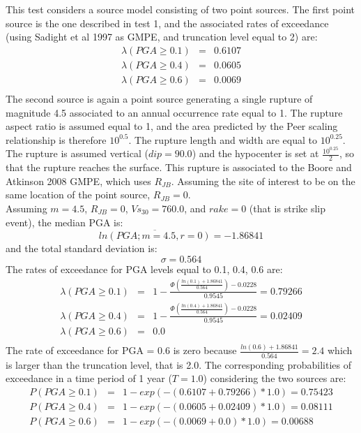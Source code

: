 This test considers a source model consisting of two point sources. The
first point source is the one described in test 1, and the associated rates of
exceedance (using Sadight et al 1997 as GMPE, and truncation level equal to 2)
are:
 \begin{eqnarray}
\lambda(PGA \geq 0.1) & = & 0.6107 \nonumber \\
\lambda(PGA \geq 0.4) & = & 0.0605 \nonumber \\
\lambda(PGA \geq 0.6) & = & 0.0069 \nonumber \\
\end{eqnarray}
The second source is again a point source generating a single rupture of
magnitude 4.5 associated to an annual occurrence rate equal to 1. The rupture
aspect ratio is assumed equal to 1, and the area predicted by the Peer scaling
relationship is therefore $10^{0.5}$. The rupture length and width are equal to
$10^{0.25}$. The rupture is assumed vertical ($dip = 90.0$) and the hypocenter
is set at $\frac{10^{0.25}}{2}$, so that the rupture reaches the surface.  This
rupture is associated to the Boore and Atkinson 2008 GMPE, which uses $R_{JB}$.
Assuming the site of interest to be on the same location of the point source,
$R_{JB} = 0$.\\
Assuming $m = 4.5$, $R_{JB} = 0$, $Vs_{30} = 760.0$, and $rake = 0$ (that is strike slip event), the median PGA is:
\begin{equation}
\overline{ln(PGA;m=4.5,r=0)} = - 1.86841
\end{equation}
and the total standard deviation is:
\begin{equation}
\sigma = 0.564
\end{equation}
The rates of exceedance for PGA levels equal to 0.1, 0.4, 0.6 are:
\begin{eqnarray}
\lambda(PGA \geq 0.1) & = & 1 - \frac{\Phi(\frac{ln(0.1) + 1.86841} {0.564}) -0.0228}
					{0.9545} = 0.79266 \nonumber \\
\lambda(PGA \geq 0.4) & = & 1 - \frac{\Phi(\frac{ln(0.4) + 1.86841} {0.564}) -0.0228}
					{0.9545} = 0.02409 \nonumber \\
\lambda(PGA \geq 0.6) & = & 0.0\nonumber \\
\end{eqnarray}
The rate of exceedance for PGA = 0.6 is zero because $\frac{ln(0.6) + 1.86841} {0.564} = 2.4$ which is larger than the truncation level, that is 2.0. 
The corresponding probabilities of exceedance in a time period of 1 year ($T=1.0$) considering the two sources are:
\begin{eqnarray}
P(PGA \geq 0.1) & = & 1 - exp(- (0.6107 + 0.79266) * 1.0) =  0.75423\nonumber \\
P(PGA \geq 0.4) & = & 1 - exp(- (0.0605 + 0.02409) * 1.0) =  0.08111\nonumber \\
P(PGA \geq 0.6) & = & 1 - exp(- (0.0069 + 0.0) * 1.0) = 0.00688 \nonumber \\
\end{eqnarray}
%
\clearpage
%
